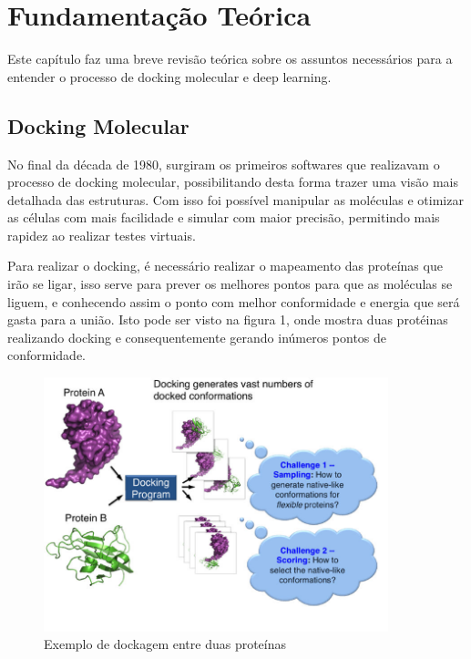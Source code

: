 \documentclass[tcc, capa]{texucpel}
\begin{document}
\chapter{Fundamentação Teórica}

Este capítulo faz uma breve revisão teórica sobre os assuntos necessários para a entender o processo de docking molecular  e deep learning.

\section{Docking Molecular}

No final da década de 1980, surgiram os primeiros softwares que realizavam o processo de docking molecular, possibilitando desta forma trazer uma visão mais detalhada das estruturas. Com isso foi possível manipular as moléculas e otimizar as células com mais facilidade e simular com maior precisão, permitindo mais rapidez ao realizar testes virtuais.
% 
% 

Para realizar o docking, é necessário realizar o mapeamento das proteínas que irão se ligar, isso serve para prever os melhores pontos para que as moléculas se liguem, e conhecendo assim o ponto com melhor conformidade e energia que será gasta para a união. Isto pode ser visto na figura 1, onde mostra duas protéinas realizando  docking e consequentemente gerando inúmeros pontos de conformidade.

      \begin{figure}[!htb]
	\centering
 \cite{xue2015protein}
    \caption{Exemplo de dockagem entre duas proteínas}
    \includegraphics[width=10cm]{imagens/mostra_docking.png}
	\end{figure}
    
\end{document}
